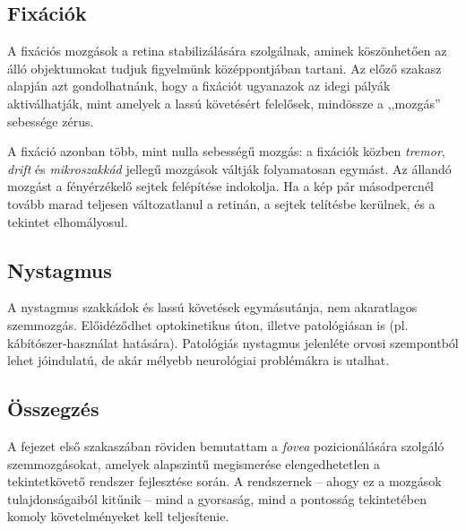 \subsection{Fixációk}\label{sect:fixaciok}

A fixációs mozgások a retina stabilizálására szolgálnak, aminek köszönhetően az álló objektumokat tudjuk figyelmünk középpontjában tartani. Az előző szakasz alapján azt gondolhatnánk, hogy a fixációt ugyanazok az idegi pályák aktiválhatják, mint amelyek a lassú követésért felelősek, mindössze a ,,mozgás'' sebessége zérus.

A fixáció azonban több, mint nulla sebességű mozgás: a fixációk közben \emph{tremor}, \emph{drift} és \emph{mikroszakkád} jellegű mozgások váltják folyamatosan egymást. Az állandó mozgást a fényérzékelő sejtek felépítése indokolja. Ha a kép pár másodpercnél tovább marad teljesen változatlanul a retinán, a sejtek telítésbe kerülnek, és a tekintet elhomályosul.

\subsection{Nystagmus}\label{sect:nystagmus}

A nystagmus szakkádok és lassú követések egymásutánja, nem akaratlagos szemmozgás. Előidéződhet optokinetikus úton, illetve patológiásan is (pl. kábítószer-használat hatására). Patológiás nystagmus jelenléte orvosi szempontból lehet jóindulatú, de akár mélyebb neurológiai problémákra is utalhat.

\subsection{Összegzés}\label{sect:mozg_osszegzes}

A fejezet első szakaszában röviden bemutattam a \emph{fovea} pozicionálására szolgáló szemmozgásokat, amelyek alapszintű megismerése elengedhetetlen a tekintetkövető rendszer fejlesztése során. A rendszernek -- ahogy ez a mozgások tulajdonságaiból kitűnik -- mind a gyorsaság, mind a pontosság tekintetében komoly követelményeket kell teljesítenie.

